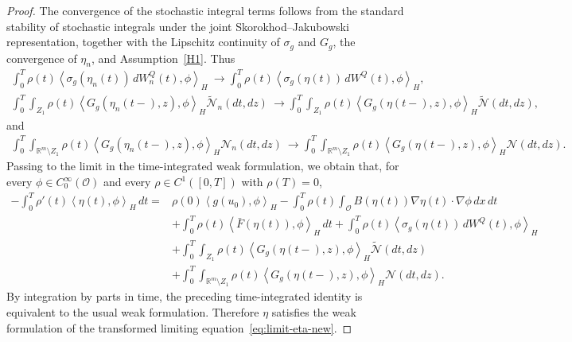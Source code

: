 \documentclass[11pt]{article}
\theoremstyle{plain}
\numberwithin{equation}{section}
\begin{document}
\begin{proof}
The convergence of the stochastic integral terms follows from the standard stability of stochastic integrals under the joint
Skorokhod--Jakubowski representation, together with the Lipschitz continuity of \(\sigma_g\) and \(G_g\), the convergence of \(\eta_n\), and
Assumption~\ref{H1}. Thus
\[
\begin{aligned}
 \int_0^T\rho(t)\left\langle\sigma_g(\eta_n(t))\,dW_n^Q(t),\phi\right\rangle_H                          
~\longrightarrow\int_0^T\rho(t)\left\langle\sigma_g(\eta(t))\,dW^Q(t),\phi \right\rangle_H ,
\end{aligned}
\]
\[
\begin{aligned}
 \int_0^T\int_{Z_1}\rho(t)\left\langle G_g(\eta_n(t-),z),\phi \right\rangle_H\tilde{\mathcal N}_n(dt,dz)                     
~\longrightarrow \int_0^T\int_{Z_1}\rho(t)\left\langle G_g(\eta(t-),z),\phi \right\rangle_H \tilde{\mathcal N}(dt,dz),
\end{aligned}
\]
and
\[
\begin{aligned}
 \int_0^T\int_{\mathbb R^m\setminus Z_1} \rho(t) \left\langle G_g(\eta_n(t-),z),\phi
\right\rangle_H \mathcal N_n(dt,dz)     ~\longrightarrow\int_0^T\int_{\mathbb R^m\setminus Z_1}
\rho(t)\left\langle G_g(\eta(t-),z),\phi \right\rangle_H \mathcal N(dt,dz).
\end{aligned}
\]
Passing to the limit in the time-integrated weak formulation, we obtain that, for every \(\phi\in C_0^\infty(\mathcal O)\) and every
\(\rho\in C^1([0,T])\) with \(\rho(T)=0\),
\[
\begin{aligned}-\int_0^T\rho'(t)\left\langle\eta(t),\phi\right\rangle_H\,dt
={}&\rho(0)\left\langle g(u_0),\phi \right\rangle_H   -\int_0^T\rho(t)\int_{\mathcal O} B(\eta(t))\nabla\eta(t)\cdot\nabla\phi\,dx\,dt   \\
&+ \int_0^T\rho(t)\left\langle\bar F(\eta(t)),\phi\right\rangle_H\,dt                                 
 +\int_0^T\rho(t)\left\langle\sigma_g(\eta(t))\,dW^Q(t),\phi\right\rangle_H       \\
&+\int_0^T\int_{Z_1}\rho(t)\left\langle G_g(\eta(t-),z),\phi\right\rangle_H\tilde{\mathcal N}(dt,dz)                            \\
&+\int_0^T\int_{\mathbb R^m\setminus Z_1}\rho(t)\left\langle G_g(\eta(t-),z), \phi \right\rangle_H \mathcal N(dt,dz).
\end{aligned}
\]
By integration by parts in time, the preceding time-integrated identity is equivalent to the usual weak formulation. Therefore \(\eta\) satisfies the
weak formulation of the transformed limiting equation~\eqref{eq:limit-eta-new}.


\end{proof}
\end{document}

